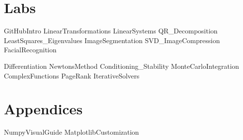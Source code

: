 \documentclass[opener-c,labs,blue,nociteref]{HJnewsiambook}
\begin{document}
\part{Labs} %
{GitHubIntro}
{LinearTransformations}
{LinearSystems}
{QR_Decomposition}
{LeastSquares_Eigenvalues}
{ImageSegmentation}
{SVD_ImageCompression}
{FacialRecognition}

{Differentiation}
{NewtonsMethod}
{Conditioning_Stability}
{MonteCarloIntegration}
{ComplexFunctions}
{PageRank}
{IterativeSolvers}

\part{Appendices} %
\begin{appendices}
{NumpyVisualGuide}
{MatplotlibCustomization}
\end{appendices}



\end{document}
